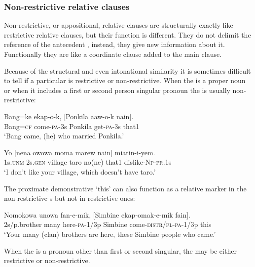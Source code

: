 \subsubsection[Non-restrictive relative clauses]{Non-restrictive relative clauses}

Non-restrictive, or appositional, relative clauses are structurally exactly like restrictive relative clauses, but their function is different. They do not delimit the reference of the antecedent , instead, they give new information about it. Functionally they are like a coordinate clause added to the main clause.

Because of the structural and even intonational similarity it is sometimes difficult to tell if a particular  is restrictive or non-restrictive. When the  is a proper noun or when it includes a first or second person singular pronoun the  is usually non-restrictive:

\ea%
\label{ex:x1567}
\gll Bang=ke  ekap-o-k,  [Ponkila  aaw-o-k  nain].\\
Bang=\textsc{cf} come-\textsc{pa}-3s Ponkila get-\textsc{pa}-3s  that1\\
\glt`Bang came, (he) who married Ponkila.'
\z


\ea%
\label{ex:x1568}
\gll Yo  [nena  owowa  moma  marew  nain]  miatin-i-yem. \\
1s.\textsc{unm} 2s.\textsc{gen} village  taro  no(ne)  that1 dislike-\textsc{Np}-\textsc{pr}.1s\\
\glt`I don't like your village, which doesn't have taro.'
\z


The proximate demonstrative  `this' can also function as a relative marker in the non-restrictive s but not in restrictive ones:

\ea%
\label{ex:x1536}
\gll Nomokowa  unowa  fan-e-mik,  [Simbine ekap-omak-e-mik  fain].\\
2s/p.brother  many  here-\textsc{pa}-1/3p Simbine come-\textsc{distr}/\textsc{pl}-\textsc{pa}-1/3p this\\
\glt`Your many (clan) brothers are here, these Simbine people who came.'
\z


When the  is a pronoun other than first or second singular, the  may be either restrictive or non-restrictive.


